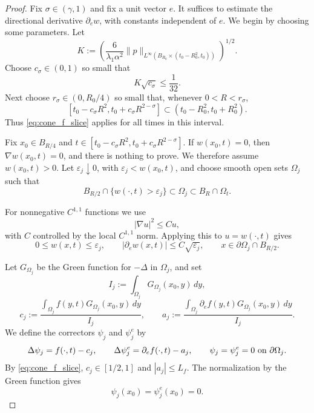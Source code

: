 \documentclass[10pt,a4paper]{amsart}
\begin{document}
\begin{proof}
Fix \(\sigma\in(\gamma,1)\) and fix a unit vector \(e\). It suffices to estimate the directional derivative $\partial_e w$, with constants independent of \(e\). We begin by choosing some parameters. Let
\[
    K:=
    \left(\frac{6}{\lambda_1\alpha^2}
    \|p\|_{L^\infty(B_{R_0}\times(t_0-R_0^2,t_0))}
    \right)^{1/2}.
\]
Choose \(c_\sigma\in(0,1)\) so small that
\begin{equation}\label{eq:cone_csigma_choice}
    K\sqrt{c_\sigma}\leq \frac1{32}.
\end{equation} Next choose \(r_\sigma\in(0,R_0/4)\) so small that, whenever
\(0<R<r_\sigma\),
\[
    [t_0-c_\sigma R^2,t_0+c_\sigma R^{2-\sigma}]
    \subset (t_0-R_0^2,t_0+R_0^2).
\]
Thus \eqref{eq:cone_f_slice} applies for all times in this interval.


Fix \(x_0\in B_{R/4}\) and \(t\in[t_0-c_\sigma R^2,t_0+c_\sigma R^{2-\sigma}]\). If
\(w(x_0,t)=0\), then \(\nabla w(x_0,t)=0\), and there is nothing to prove. We therefore assume
\(w(x_0,t)>0\). Let \(\varepsilon_j\downarrow0\), with
\(\varepsilon_j<w(x_0,t)\), and choose smooth open sets $\Omega_j$ such that 
\begin{equation}\label{eq:cone_Omega_j}
    B_{R/2}\cap\{w(\cdot,t)>\varepsilon_j\}\subset\Omega_j
    \subset B_R\cap\Omega_t.
\end{equation}

For nonnegative \(C^{1,1}\) functions we use
\begin{equation}\label{eq:cone_c11_sqrt}
    |\nabla u|^2\leq C u,
\end{equation}
with \(C\) controlled by the local \(C^{1,1}\) norm. Applying this to
\(u=w(\cdot,t)\) gives
\begin{equation}\label{eq:cone_inner_boundary_smallness}
    0\leq w(x,t)\leq\varepsilon_j,
    \qquad
    |\partial_e w(x,t)|\leq C\sqrt{\varepsilon_j},
    \qquad x\in\partial\Omega_j\cap B_{R/2}.
\end{equation}

Let \(G_{\Omega_j}\) be the Green function for \(-\Delta\) in \(\Omega_j\), and
set
\[
    I_j:=\int_{\Omega_j}G_{\Omega_j}(x_0,y)\,dy,
\]
\[
    c_j:=
    \frac{\int_{\Omega_j}f(y,t)G_{\Omega_j}(x_0,y)\,dy}{I_j},
    \qquad
    a_j:=
    \frac{\int_{\Omega_j}\partial_e f(y,t)G_{\Omega_j}(x_0,y)\,dy}{I_j}.
\]
We define the correctors \(\psi_j\) and \(\psi_j^e\) by
\[
    \Delta\psi_j=f(\cdot,t)-c_j,
    \qquad
    \Delta\psi_j^e=\partial_e f(\cdot,t)-a_j,
    \qquad
    \psi_j=\psi_j^e=0\hbox{ on }\partial\Omega_j.
\]
By \eqref{eq:cone_f_slice}, \(c_j\in[1/2,1]\) and \(|a_j|\leq L_f\).  The
normalization by the Green function gives
\begin{equation}\label{eq:cone_corrector_center}
    \psi_j(x_0)=\psi_j^e(x_0)=0.
\end{equation}


\end{proof}
\end{document}
